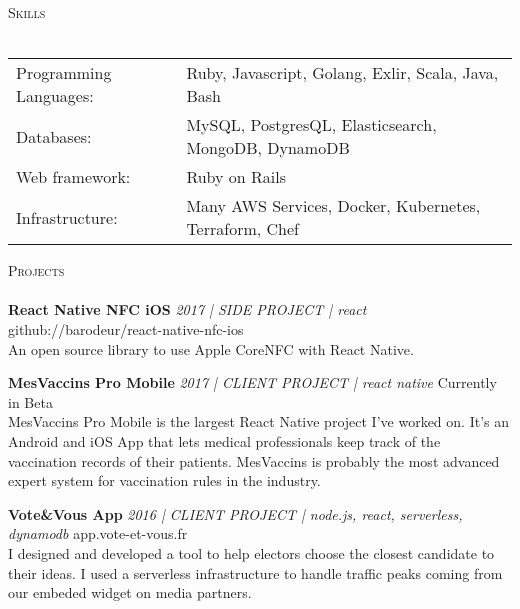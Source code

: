 \documentclass[a4paper]{article}
\newcommand{\lineunder} {
    \vspace*{-8pt} \\
    \hspace*{-18pt} \hrulefill \\
}
\newcommand{\header} [1] {
    {\hspace*{-18pt}\vspace*{6pt} \textsc{#1}}
    \vspace*{-6pt} \lineunder
}
\begin{document}
\header{Skills}
\begin{tabular}{ l l }
	Programming Languages: & Ruby, Javascript, Golang, Exlir, Scala, Java, Bash   \\
	Databases:      & MySQL, PostgresQL, Elasticsearch, MongoDB, DynamoDB  \\
	Web framework:        & Ruby on Rails                                        \\
    Infrastructure:        & Many AWS Services, Docker, Kubernetes, Terraform, Chef                    \\
\end{tabular}


\pagebreak

\header{Projects}
{\textbf{React Native NFC iOS} \sl 2017 | SIDE PROJECT | react} \hfill github://barodeur/react-native-nfc-ios\\
An open source library to use Apple CoreNFC with React Native.\\
\vspace*{2mm}


{\textbf{MesVaccins Pro Mobile} \sl 2017 | CLIENT PROJECT | react native} \hfill Currently in Beta\\
MesVaccins Pro Mobile is the largest React Native project I've worked on.
It's an Android and iOS App that lets medical professionals keep track of the vaccination records of their patients.
MesVaccins is probably the most advanced expert system for vaccination rules in the industry.\\
\vspace*{2mm}

{\textbf{Vote\&Vous App} \sl 2016 | CLIENT PROJECT | node.js, react, serverless, dynamodb} \hfill app.vote-et-vous.fr\\
I designed and developed a tool to help electors choose the closest candidate to their ideas.
I used a serverless infrastructure to handle traffic peaks coming from our embeded widget on media partners.
\vspace*{2mm}
\end{document}
